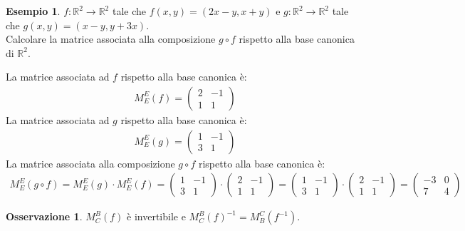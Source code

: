 \documentclass[a4paper]{article}
\theoremstyle{definition}
\newtheorem*{oss}{Osservazione}
\newtheorem*{es}{Esempio}
\begin{document}
\begin{es}
	$f:\mathbb{R}^2 \rightarrow \mathbb{R}^2$ tale che $f(x, y) = (2x - y, x + y)$ e $g:\mathbb{R}^2 \rightarrow \mathbb{R}^2$ tale che $g(x, y) = (x - y, y + 3x)$. \\
	Calcolare la matrice associata alla composizione $g \circ f$ rispetto alla base canonica di $\mathbb{R}^2$.

	La matrice associata ad $f$ rispetto alla base canonica è:
	\begin{align*}
		M_E^E(f) = \begin{pmatrix}
			2 & -1 \\
			1 & 1
		\end{pmatrix}
	\end{align*}
	La matrice associata ad $g$ rispetto alla base canonica è:
	\begin{align*}
		M_E^E(g) = \begin{pmatrix}
			1 & -1 \\
			3 & 1
		\end{pmatrix}
	\end{align*}
	La matrice associata alla composizione $g \circ f$ rispetto alla base canonica è:
	\begin{align*}
		M_E^E(g \circ f) = M_E^E(g) \cdot M_E^E(f) = \begin{pmatrix}
			1 & -1 \\
			3 & 1
		\end{pmatrix} \cdot \begin{pmatrix}
			2 & -1 \\
			1 & 1
		\end{pmatrix} = \begin{pmatrix}
			1 & -1 \\
			3 & 1
		\end{pmatrix} \cdot \begin{pmatrix}
			2 & -1 \\
			1 & 1
		\end{pmatrix} = \begin{pmatrix}
			-3 & 0 \\
			7 & 4
		\end{pmatrix}
	\end{align*}
\end{es}

\begin{oss}
	$M_C^B(f)$ è invertibile e $M_C^B(f)^{-1} = M_B^C(f^{-1})$.
\end{oss}
\end{document}
